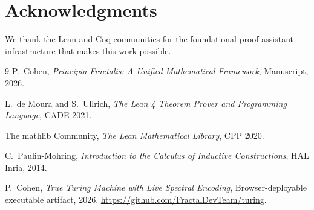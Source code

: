 \documentclass[11pt,a4paper]{article}
\theoremstyle{definition}
\begin{document}
\section*{Acknowledgments}
We thank the Lean and Coq communities for the foundational
proof-assistant infrastructure that makes this work possible.

\begin{thebibliography}{9}
P.~Cohen,
\emph{Principia Fractalis: A Unified Mathematical Framework},
Manuscript, 2026.

L.~de Moura and S.~Ullrich,
\emph{The Lean 4 Theorem Prover and Programming Language},
CADE 2021.

The mathlib Community,
\emph{The Lean Mathematical Library},
CPP 2020.

C.~Paulin-Mohring,
\emph{Introduction to the Calculus of Inductive Constructions},
HAL Inria, 2014.

P.~Cohen,
\emph{True Turing Machine with Live Spectral Encoding},
Browser-deployable executable artifact, 2026.
\url{https://github.com/FractalDevTeam/turing}.
\end{thebibliography}
\end{document}

